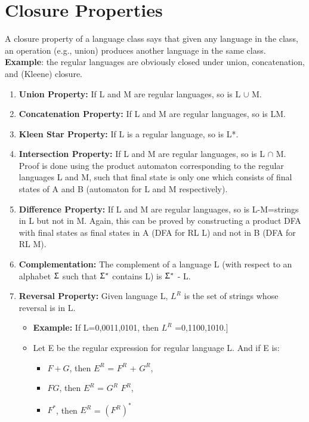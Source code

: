 \documentclass{report}
\begin{document}
\section{Closure Properties}
A closure property of a language class says that given any language in the class, an operation (e.g., union) produces another language in the same class. \textbf{Example}: the regular languages are obviously closed under union, concatenation, and (Kleene) closure.

\begin{enumerate}
    \item \textbf{Union Property:} If L and M are regular languages, so is L $\cup$ M.
    \item \textbf{Concatenation Property:} If L and M are regular languages, so is LM.
    \item \textbf{Kleen Star Property:} If L is a regular language, so is L*.
    \item \textbf{Intersection Property:} If L and M are regular languages, so is L $\cap$ M. Proof is done using the product automaton corresponding to the regular languages L and M, such that final state is only one which consists of final states of A and B (automaton for L and M respectively).
    \item \textbf{Difference Property:} If L and M are regular languages, so is L-M=strings in L but not in M. Again, this can be proved by constructing a product DFA with final states as final states in A (DFA for RL L) and not in B (DFA for RL M). 
    \item \textbf{Complementation:} The complement of a language L (with respect to an alphabet $\Upsigma$ such that $\Upsigma^*$ contains L) is $\Upsigma^*$ - L. 
    \item \textbf{Reversal Property:} Given language L, $L^R$ is the set of strings whose reversal is in L.
    \begin{itemize}
        \item \textbf{Example:} If L={0,0011,0101}, then $L^R$ ={0,1100,1010}.]
        \item Let E be the regular expression for regular language L. And if E is:
        \begin{itemize}
            \item $F+G$, then $E^R$ = $F^R$ + $G^R$,
            \item $FG$, then $E^R$ = $G^R$ $F^R$,
            \item $F^*$, then $E^R$ = $(F^R)^*$
        \end{itemize}
    \end{itemize}
\end{enumerate}
\end{document}
